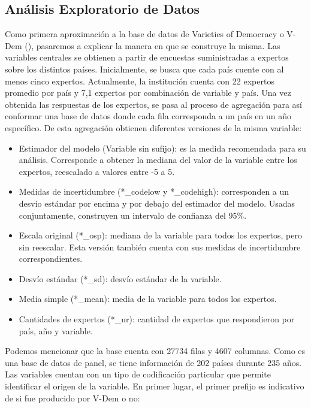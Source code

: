 \documentclass{article}
\begin{document}
\subsection{Análisis Exploratorio de Datos}
Como primera aproximación a la base de datos de Varieties of Democracy o V-Dem 
(\cite{CopMet24}), pasaremos a explicar la manera en que se construye la misma. Las
variables centrales se obtienen a partir de encuestas suministradas a expertos
sobre los distintos países. Inicialmente, se busca que cada país cuente con al menos
cinco expertos. Actualmente, la institución cuenta con 22 expertos promedio por país
y 7,1 expertos por combinación de variable y país. Una vez obtenida las respuestas
de los expertos, se pasa al proceso de agregación para así conformar una base de 
datos donde cada fila corresponda a un país en un año específico. De esta agregación
obtienen diferentes versiones de la misma variable:

\begin{itemize}
  \item Estimador del modelo (Variable sin sufijo): es la medida
   recomendada para su análisis. Corresponde a obtener la mediana del valor de 
   la variable entre los expertos, reescalado a valores entre -5 a 5.
  \item Medidas de incertidumbre (*\_codelow y *\_codehigh): corresponden a un 
  desvío estándar por encima y por debajo del estimador del modelo. 
  Usadas conjuntamente, construyen un intervalo de confianza del 95\%.
  \item Escala original (*\_osp): mediana de la variable para todos los expertos, pero sin 
  reescalar. Esta versión también cuenta con sus medidas de incertidumbre correspondientes.
  \item Desvío estándar (*\_sd): desvío estándar de la variable.
  \item Media simple (*\_mean): media de la variable para todos los expertos.
  \item Cantidades de expertos (*\_nr): cantidad de expertos que respondieron por
  país, año y variable.
\end{itemize}

Podemos mencionar que la base cuenta con 27734 filas y 4607 columnas. Como es una 
base de datos de panel, se tiene información de 202 países durante 235 años. Las 
variables cuentan con un tipo de codificación particular que permite identificar el 
origen de la  variable. En primer lugar, el primer prefijo es indicativo de si fue 
producido por V-Dem o no:
\end{document}
